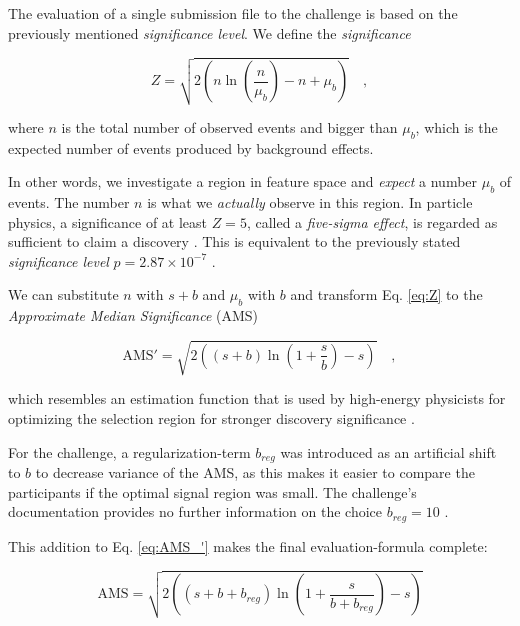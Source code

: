 The evaluation of a single submission file to the challenge is based on the previously mentioned \emph{significance level}.
We define the \emph{significance}

\begin{equation}\label{eq:Z}
	Z = \sqrt{2 \left(n \ln{\left( \frac{n}{\mu_b} \right)} -
	n + \mu_b \right)} \mathrm{\hspace{1em},}
\end{equation}

where $n$ is the total number of observed events and bigger than $\mu_b$, which is the expected number of events produced by background effects.

In other words, we investigate a region in feature space and \emph{expect} a number $\mu_b$ of events. The number $n$ is what we \emph{actually} observe in this region. In particle physics, a significance of at least $Z=5$, called a \emph{five-sigma effect}, is regarded as sufficient to claim a discovery . This is equivalent to the previously stated \emph{significance level} $p = 2.87 \times 10^{-7}$ \cite{higgsPaper}.

We can substitute $n$ with $s+b$ and $\mu_b$ with $b$ and transform Eq. \eqref{eq:Z} to the \emph{Approximate Median Significance} (AMS)

\begin{equation}\label{eq:AMS_'}
	\mathrm{AMS'} = \sqrt{2 \left( \left( s+b \right) \ln{ \left(1+ \frac{s}
	{b}  \right)} - s \right)} \mathrm{\hspace{1em},}
\end{equation}

which resembles an estimation function that is used by high-energy physicists for optimizing the selection region for stronger discovery significance \cite{higgsPaper}. 

For the challenge, a regularization-term $b_{reg}$ was introduced as an artificial shift to $b$ to decrease variance of the AMS, as this makes it easier to compare the participants if the optimal signal region was small. The challenge's documentation provides no further information on the choice $b_{reg}=10$ \cite{higgsPaper}.

This addition to Eq. \eqref{eq:AMS_'} makes the final evaluation-formula complete:

\begin{equation}\label{eq:AMS}
	\mathrm{AMS} = \sqrt{2 \left( \left( s+b+b_{reg} \right) \ln{ \left(1+ \frac{s}
	{b+b_{reg}}  \right)} - s \right)}
\end{equation}


